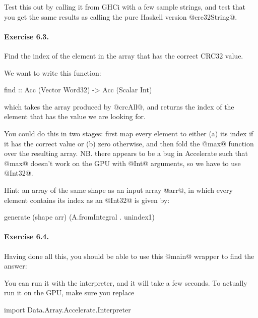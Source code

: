 \documentclass[11pt,a4paper]{article}
\begin{document}
Test this out by calling it from GHCi with a few sample strings, and
test that you get the same results as calling the pure Haskell version
@crc32String@.

\paragraph{Exercise 6.3.} Find the index of the element in the array
that has the correct CRC32 value.

We want to write this function:

\begin{haskell}
find :: Acc (Vector Word32) -> Acc (Scalar Int)
\end{haskell}

\noindent which takes the array produced by @crcAll@, and returns the
index of the element that has the value we are looking for.

You could do this in two stages: first map every element to either (a)
its index if it has the correct value or (b) zero otherwise, and then
fold the @max@ function over the resulting array.  NB. there appears
to be a bug in Accelerate such that @max@ doesn't work on the GPU with
@Int@ arguments, so we have to use @Int32@.

Hint: an array of the same shape as an input array @arr@, in which
every element contains its index as an @Int32@ is given by:

\begin{haskell}
    generate (shape arr) (A.fromIntegral . unindex1)
\end{haskell}

\paragraph{Exercise 6.4.} Having done all this, you should be able to
use this @main@ wrapper to find the answer:


You can run it with the interpreter, and it will take a few seconds.
To actually run it on the GPU, make sure you replace

\begin{haskell}
import Data.Array.Accelerate.Interpreter
\end{haskell}
\end{document}
